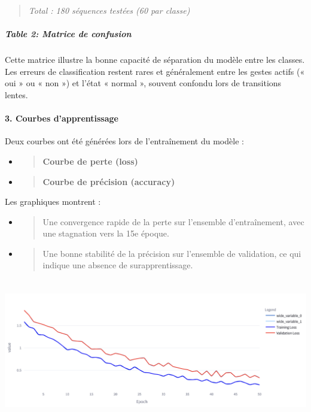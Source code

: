 \documentclass[
]{article}
\begin{document}
\begin{quote}
\emph{Total : 180 séquences testées (60 par classe)}
\end{quote}

\hypertarget{table-2-matrice-de-confusion}{%
\subparagraph{Table 2: Matrice de confusion}\label{table-2-matrice-de-confusion}}

Cette matrice illustre la bonne capacité de séparation du modèle entre les classes. Les erreurs de classification restent rares et généralement entre les gestes actifs (« oui » ou « non ») et l'état « normal », souvent confondu lors de transitions lentes.

\hypertarget{courbes-dapprentissage}{%
\paragraph{\texorpdfstring{\textbf{3. Courbes d'apprentissage}}{3. Courbes d'apprentissage}}\label{courbes-dapprentissage}}

Deux courbes ont été générées lors de l'entraînement du modèle :

\begin{itemize}
\item
  \begin{quote}
  \textbf{Courbe de perte (loss)\\
  }
  \end{quote}
\item
  \begin{quote}
  \textbf{Courbe de précision (accuracy)\\
  }
  \end{quote}
\end{itemize}

Les graphiques montrent :

\begin{itemize}
\item
  \begin{quote}
  Une convergence rapide de la perte sur l'ensemble d'entraînement, avec une stagnation vers la 15e époque.
  \end{quote}
\item
  \begin{quote}
  Une bonne stabilité de la précision sur l'ensemble de validation, ce qui indique une absence de surapprentissage.
  \end{quote}
\end{itemize}

\includegraphics[width=6.5in,height=2.45833in]{0528136f-968b-4a39-becd-3323677c0324_media/media/image4.png}
\end{document}
